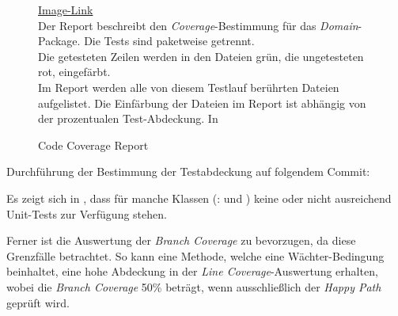 \begin{figure}[ht!]
\vspace{0.25cm}
\begin{center}
\caption{Code Coverage Report}
\label{fig:Cover}
\end{center}

\vspace{0.25cm}
\href{https://github.com/MaagMich/SWE2\_Project/blob/c5c3674bd201ee306463881cf711bb2ce9229842/Ausarbeitung/Pictures/CodeCoverage.png}{Image-Link}\\
Der Report beschreibt den \textit{Coverage}-Bestimmung für das \textit{Domain}-Package. Die Tests sind paketweise getrennt.\\
Die getesteten Zeilen werden in den Dateien grün, die ungetesteten rot, eingefärbt.\\
Im Report werden alle von diesem Testlauf berührten Dateien aufgelistet. Die Einfärbung der Dateien im Report ist abhängig von der prozentualen Test-Abdeckung. 
In 
\end{figure}

Durchführung der Bestimmung der Testabdeckung auf folgendem Commit:\\


Es zeigt sich in , dass für manche Klassen (\zB:  und ) keine oder nicht ausreichend Unit-Tests zur Verfügung stehen.

Ferner ist die Auswertung der \textit{Branch Coverage} zu bevorzugen, da diese Grenzfälle betrachtet. So kann eine Methode, welche eine Wächter-Bedingung beinhaltet, eine hohe Abdeckung in der \textit{Line Coverage}-Auswertung erhalten, wobei die \textit{Branch Coverage} 50\% beträgt, wenn ausschließlich der \textit{Happy Path} geprüft wird.

